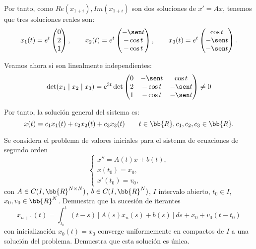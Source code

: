 \begin{ejercicio}
\begin{enumerate}
        Por tanto, como $Re(x_{1+i}), Im(x_{1+i})$ son dos soluciones de $x' = Ax$, tenemos que tres soluciones reales son:
        \begin{equation*}
            x_1(t) = e^t\begin{pmatrix}
                0\\
                2\\
                1
            \end{pmatrix},\qquad
            x_2(t) = e^t\begin{pmatrix}
                -\sen t\\
                -\cos t\\
                -\cos t
            \end{pmatrix},\qquad
            x_3(t) = e^t\begin{pmatrix}
                \cos t\\
                -\sen t\\
                -\sen t
            \end{pmatrix}.
        \end{equation*}

        Veamos ahora si son linealmente independientes:
        \begin{equation*}
            \det(x_1\mid x_2\mid x_3) = e^{3t}\det\begin{pmatrix}
                0 & -\sen t & \cos t\\
                2 & -\cos t & -\sen t\\
                1 & -\cos t & -\sen t
            \end{pmatrix}\neq 0
        \end{equation*}

        Por tanto, la solución general del sistema es:
        \begin{equation*}
            x(t) = c_1x_1(t) + c_2x_2(t) + c_3x_3(t)\qquad t\in \bb{R}, c_1, c_2, c_3\in \bb{R}.
        \end{equation*}
    \end{enumerate}
\end{ejercicio}

\begin{ejercicio}\label{ej:5.2}
    Se considera el problema de valores iniciales para el sistema de ecuaciones de segundo orden
    \[
        \begin{cases}
            x'' = A(t)x + b(t),\\
            x(t_0) = x_0,\\
            x'(t_0) = v_0,
        \end{cases}
    \]
    con $A \in C(I, \bb{R}^{N\times N})$, $b \in C(I, \bb{R}^N)$, $I$ intervalo abierto, $t_0 \in I$, $x_0, v_0 \in \bb{R}^N$. Demuestra que la sucesión de iterantes
    \[
        x_{n+1}(t) = \int_{t_0}^t (t - s)[A(s)x_n(s) + b(s)]ds + x_0 + v_0(t - t_0)
    \]
    con inicialización $x_0(t) = x_0$ converge uniformemente en compactos de $I$ a una solución del problema. Demuestra que esta solución es única.

\end{ejercicio}

